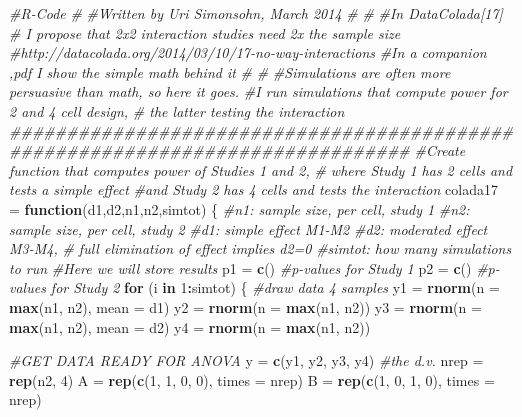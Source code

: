 \documentclass[]{book}
\newenvironment{Shaded}{\begin{snugshade}}{\end{snugshade}}
\newcommand{\CommentTok}[1]{\textcolor[rgb]{0.56,0.35,0.01}{\textit{#1}}}
\newcommand{\ControlFlowTok}[1]{\textcolor[rgb]{0.13,0.29,0.53}{\textbf{#1}}}
\newcommand{\DataTypeTok}[1]{\textcolor[rgb]{0.13,0.29,0.53}{#1}}
\newcommand{\DecValTok}[1]{\textcolor[rgb]{0.00,0.00,0.81}{#1}}
\newcommand{\KeywordTok}[1]{\textcolor[rgb]{0.13,0.29,0.53}{\textbf{#1}}}
\newcommand{\NormalTok}[1]{#1}
\newcommand{\OperatorTok}[1]{\textcolor[rgb]{0.81,0.36,0.00}{\textbf{#1}}}
\newcommand{\StringTok}[1]{\textcolor[rgb]{0.31,0.60,0.02}{#1}}
\begin{document}
\begin{Shaded}
\begin{Highlighting}[]
\CommentTok{#R-Code}
\CommentTok{#}
\CommentTok{#Written by Uri Simonsohn, March 2014}
\CommentTok{#}
\CommentTok{#}
\CommentTok{#In DataColada[17] }
\CommentTok{# I propose that 2x2 interaction studies need 2x the sample size}
\CommentTok{#http://datacolada.org/2014/03/10/17-no-way-interactions}
\CommentTok{#In a companion ,pdf I show the simple math behind it}
\CommentTok{#}
\CommentTok{#}
\CommentTok{#Simulations are often more persuasive than math, so here it goes.}
\CommentTok{#I run simulations that compute power for 2 and 4 cell design, }
\CommentTok{# the latter testing the interaction}
\CommentTok{###############################################################################}
\CommentTok{#Create function that computes power of Studies 1 and 2, }
\CommentTok{# where Study 1  has 2 cells and tests a simple effect}
\CommentTok{#and Study 2 has 4 cells and tests the interaction}
\NormalTok{colada17 =}\StringTok{ }\ControlFlowTok{function}\NormalTok{(d1,d2,n1,n2,simtot)}
\NormalTok{  \{}
  \CommentTok{#n1: sample size, per cell, study 1}
  \CommentTok{#n2: sample size, per cell, study 2}
  \CommentTok{#d1: simple effect M1-M2}
  \CommentTok{#d2: moderated effect M3-M4, }
  \CommentTok{# full elimination of effect implies d2=0}
  \CommentTok{#simtot: how many simulations to run}
  \CommentTok{#Here we will store results}
\NormalTok{      p1 =}\StringTok{ }\KeywordTok{c}\NormalTok{()    }\CommentTok{#p-values for Study 1}
\NormalTok{      p2 =}\StringTok{ }\KeywordTok{c}\NormalTok{()    }\CommentTok{#p-values for Study 2}
  \ControlFlowTok{for}\NormalTok{ (i }\ControlFlowTok{in} \DecValTok{1}\OperatorTok{:}\NormalTok{simtot) \{}
    \CommentTok{#draw data 4 samples}
\NormalTok{    y1 =}\StringTok{ }\KeywordTok{rnorm}\NormalTok{(}\DataTypeTok{n =} \KeywordTok{max}\NormalTok{(n1, n2), }\DataTypeTok{mean =}\NormalTok{ d1)}
\NormalTok{    y2 =}\StringTok{ }\KeywordTok{rnorm}\NormalTok{(}\DataTypeTok{n =} \KeywordTok{max}\NormalTok{(n1, n2))}
\NormalTok{    y3 =}\StringTok{ }\KeywordTok{rnorm}\NormalTok{(}\DataTypeTok{n =} \KeywordTok{max}\NormalTok{(n1, n2), }\DataTypeTok{mean =}\NormalTok{ d2)}
\NormalTok{    y4 =}\StringTok{ }\KeywordTok{rnorm}\NormalTok{(}\DataTypeTok{n =} \KeywordTok{max}\NormalTok{(n1, n2))}
    
    \CommentTok{#GET DATA READY FOR ANOVA  }
\NormalTok{    y =}\StringTok{ }\KeywordTok{c}\NormalTok{(y1, y2, y3, y4)          }\CommentTok{#the d.v.}
\NormalTok{    nrep =}\StringTok{ }\KeywordTok{rep}\NormalTok{(n2, }\DecValTok{4}\NormalTok{)}
\NormalTok{    A =}\StringTok{ }\KeywordTok{rep}\NormalTok{(}\KeywordTok{c}\NormalTok{(}\DecValTok{1}\NormalTok{, }\DecValTok{1}\NormalTok{, }\DecValTok{0}\NormalTok{, }\DecValTok{0}\NormalTok{), }\DataTypeTok{times =}\NormalTok{ nrep)}
\NormalTok{    B =}\StringTok{ }\KeywordTok{rep}\NormalTok{(}\KeywordTok{c}\NormalTok{(}\DecValTok{1}\NormalTok{, }\DecValTok{0}\NormalTok{, }\DecValTok{1}\NormalTok{, }\DecValTok{0}\NormalTok{), }\DataTypeTok{times =}\NormalTok{ nrep)}
    

\end{Highlighting}
\end{Shaded}
\end{document}
